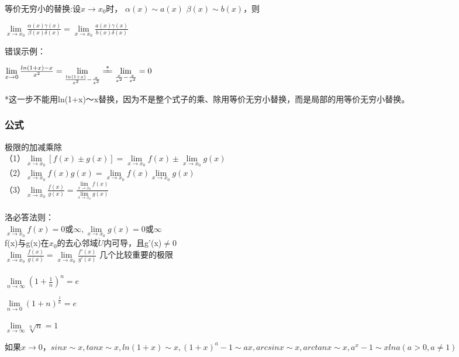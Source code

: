 \documentclass{ctexart}
\begin{document}
等价无穷小的替换:设$x\rightarrow x_0$时， $\alpha (x) \sim a(x)$ $\beta (x) \sim b(x)$，则
\begin{center}
$\lim\limits_{x\rightarrow x_0}\frac{\alpha (x)\gamma (x)}{\beta (x)\delta (x)}=\lim\limits_{x\rightarrow x_0}\frac{a (x)\gamma (x)}{b (x)\delta (x)}$ 
\end{center}
错误示例：
\begin{center}
$\lim\limits_{x\rightarrow 0}\frac{ln(1+x)-x}{x^2}=\lim\limits_{\frac{ln(1+x)}{x^2}-\frac{x}{x^2}}\xlongequal{*}\lim\limits_{\frac{x}{x^2}-\frac{x}{x^2}}=0$
\end{center}
*这一步不能用ln(1+x)～x替换，因为不是整个式子的乘、除用等价无穷小替换，而是局部的用等价无穷小替换。
\subsubsection{公式}
极限的加减乘除\\

（1）$\lim\limits_{x \rightarrow x_0 }[f(x)\pm g(x)]=\lim\limits_{x \rightarrow x_0} f(x)\pm \lim\limits_{x \rightarrow x_0}g(x)$
\\

（2）$\lim\limits_{x \rightarrow x_0}f(x)g(x)=\lim\limits_{x \rightarrow x_0}f(x) \lim\limits_{x \rightarrow x_0}g(x)$
\\

（3）$\lim\limits_{x \rightarrow x_0} \frac{f(x)}{g(x)}=\frac{\lim\limits_{x \rightarrow x_0}f(x)}{\lim\limits_{x \rightarrow x_0}g(x)}$
\\\\

洛必答法则：\\
$\lim\limits_{x\rightarrow x_0}f(x)=0 \text{或} \infty,\lim\limits_{x\rightarrow x_0}g(x)=0 \text{或} \infty$\\
f(x)与g(x)在$x_0$的去心邻域$\mathring{U}$内可导，且g'(x)$\neq$0\\
$\lim\limits_{x\rightarrow x_0}\frac{f(x)}{g(x)}=\lim\limits_{x\rightarrow x_0}\frac{f'(x)}{g'(x)}$
几个比较重要的极限
\\\\

$\lim\limits_{n \rightarrow \infty }(1+ \frac{1}{n})^n=e$

$\lim\limits_{n \rightarrow 0 }(1+ n)^\frac{1}{n}=e$

$\lim\limits_{x\rightarrow \infty} \sqrt[n]{n}=1$

如果$x\rightarrow 0，sinx \sim x,tanx \sim x, ln(1+x)\sim x, (1+x)^a-1\sim ax, arcsinx\sim x, arctanx\sim x, a^x-1\sim xlna(a>0,a \neq 1)$
\end{document}
